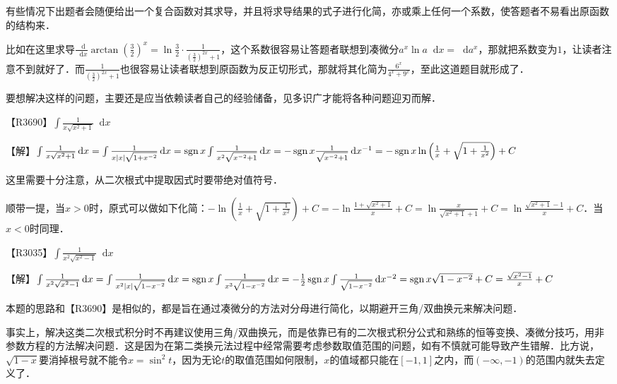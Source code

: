 \documentclass{ctexbook}
\DeclareMathOperator{\sgn}{sgn}
\newcommand*{\dif}{\mathop{}\!\mathrm{d}}
\begin{document}
{\kaishu 有些情况下出题者会随便给出一个复合函数对其求导，并且将求导结果的式子进行化简，亦或乘上任何一个系数，使答题者不易看出原函数的结构来．\par
比如在这里求导$\frac{\dif}{\dif{x}}\arctan{\left(\frac{3}{2}\right)^{x}}=\ln{\frac{3}{2}}\cdot\frac{1}{\left(\frac{3}{2}\right)^{2x}+1}$，这个系数很容易让答题者联想到凑微分$a^{x}\ln{a}\dif{x}=\dif{a^{x}}$，那就把系数变为$1$，让读者注意不到就好了．而$\frac{1}{\left(\frac{3}{2}\right)^{2x}+1}$也很容易让读者联想到原函数为反正切形式，那就将其化简为$\frac{6^{x}}{4^{x}+9^{x}}$，至此这道题目就形成了．\par
要想解决这样的问题，主要还是应当依赖读者自己的经验储备，见多识广才能将各种问题迎刃而解．}\par
【R3690】$\int\frac{1}{x\sqrt{x^{2}+1}}\dif{x}$\par
【解】$\int\frac{1}{x\sqrt{x^{2}+1}}\dif{x}\\=\int\frac{1}{x\left|x\right|\sqrt{1+x^{-2}}}\dif{x}\\=\sgn{x}\int\frac{1}{x^{2}\sqrt{x^{-2}+1}}\dif{x}\\=-\sgn{x}\frac{1}{\sqrt{x^{-2}+1}}\dif{x^{-1}}\\=-\sgn{x}\ln{\left(\frac{1}{x}+\sqrt{1+\frac{1}{x^{2}}}\right)}+C$\par
{\kaishu 这里需要十分注意，从二次根式中提取因式时要带绝对值符号．\par
顺带一提，当$x>0$时，原式可以做如下化简：$-\ln{\left(\frac{1}{x}+\sqrt{1+\frac{1}{x^{2}}}\right)}+C=-\ln{\frac{1+\sqrt{x^{2}+1}}{x}}+C=\ln{\frac{x}{\sqrt{x^{2}+1}+1}}+C=\ln{\frac{\sqrt{x^{2}+1}-1}{x}}+C$．当$x<0$时同理．}\par
【R3035】$\int\frac{1}{x^{2}\sqrt{x^{2}-1}}\dif{x}$\par
【解】$\int\frac{1}{x^{2}\sqrt{x^{2}-1}}\dif{x}\\=\int\frac{1}{x^{2}\left|x\right|\sqrt{1-x^{-2}}}\dif{x}\\=\sgn{x}\int\frac{1}{x^{3}\sqrt{1-x^{-2}}}\dif{x}=-\frac{1}{2}\sgn{x}\int\frac{1}{\sqrt{1-x^{-2}}}\dif{x^{-2}}\\=\sgn{x}\sqrt{1-x^{-2}}+C\\=\frac{\sqrt{x^{2}-1}}{x}+C$\par
{\kaishu 本题的思路和【R3690】是相似的，都是旨在通过凑微分的方法对分母进行简化，以期避开三角/双曲换元来解决问题．\par
事实上，解决这类二次根式积分时不再建议使用三角/双曲换元，而是依靠已有的二次根式积分公式和熟练的恒等变换、凑微分技巧，用非参数方程的方法解决问题．这是因为在第二类换元法过程中经常需要考虑参数取值范围的问题，如有不慎就可能导致产生错解．比方说，$\sqrt{1-x}$要消掉根号就不能令$x=\sin^{2}{t}$，因为无论$t$的取值范围如何限制，$x$的值域都只能在$\left[-1,1\right]$之内，而$\left(-\infty,-1\right)$的范围内就失去定义了．}\par
\end{document}
